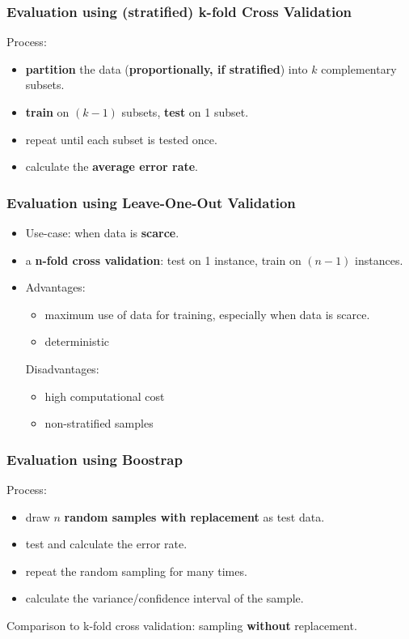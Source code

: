 \subsubsection{Evaluation using (stratified) k-fold Cross Validation}
Process:
\begin{itemize}
	\item \textbf{partition} the data (\textbf{proportionally, if stratified}) into $k$ complementary subsets. 
	\item \textbf{train} on $(k-1)$ subsets, \textbf{test} on 1 subset.
	\item repeat until each subset is tested once.
	\item calculate the \textbf{average error rate}.
\end{itemize}

\subsubsection{Evaluation using Leave-One-Out Validation}
\begin{itemize}
	\item Use-case: when data is \textbf{scarce}.
	\item a \textbf{n-fold cross validation}: test on 1 instance, train on $(n-1)$ instances.
	\item Advantages:
	\begin{itemize}
		\item maximum use of data for training, especially when data is scarce.
		\item deterministic
	\end{itemize}
	Disadvantages:
	\begin{itemize}
		\item high computational cost
		\item non-stratified samples
	\end{itemize}
\end{itemize}

\subsubsection{Evaluation using Boostrap}
Process:
\begin{itemize}
	\item draw $n$ \textbf{random samples with replacement} as test data.
	\item test and calculate the error rate.
	\item repeat the random sampling for many times.
	\item calculate the variance/confidence interval of the sample.
\end{itemize}
Comparison to k-fold cross validation: sampling \textbf{without} replacement. 

